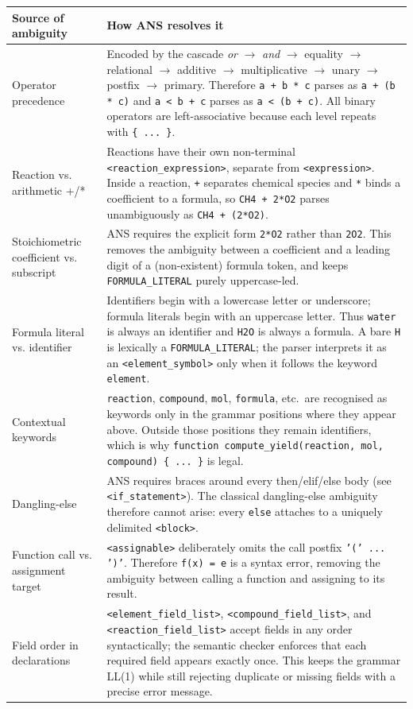 \documentclass[11pt,a4paper]{article}
\newcommand{\thd}[1]{\textbf{\color{white}#1}}
\newcommand{\code}[1]{\texttt{#1}}
\begin{document}
{\footnotesize
{}
\begin{tabularx}{\linewidth}{@{}>{\RaggedRight\arraybackslash}p{4.0cm} Y@{}}
\toprule
{}\thd{Source of ambiguity} & \thd{How ANS resolves it}\\
\midrule
Operator precedence
  & Encoded by the cascade
    \textit{or} $\to$ \textit{and} $\to$ equality $\to$ relational $\to$
    additive $\to$ multiplicative $\to$ unary $\to$ postfix $\to$ primary.
    Therefore \code{a + b * c} parses as \code{a + (b * c)} and
    \code{a < b + c} parses as \code{a < (b + c)}. All binary operators are
    left-associative because each level repeats with \code{\{ ... \}}.\\
Reaction vs. arithmetic +/*
  & Reactions have their own non-terminal \code{<reaction\_expression>},
    separate from \code{<expression>}. Inside a reaction, \code{+} separates
    chemical species and \code{*} binds a coefficient to a formula, so
    \code{CH4 + 2*O2} parses unambiguously as \code{CH4 + (2*O2)}.\\
Stoichiometric coefficient vs. subscript
  & ANS requires the explicit form \code{2*O2} rather than \code{2O2}. This
    removes the ambiguity between a coefficient and a leading digit of a
    (non-existent) formula token, and keeps \code{FORMULA\_LITERAL} purely
    uppercase-led.\\
Formula literal vs. identifier
  & Identifiers begin with a lowercase letter or underscore; formula literals
    begin with an uppercase letter. Thus \code{water} is always an identifier
    and \code{H2O} is always a formula. A bare \code{H} is lexically a
    \code{FORMULA\_LITERAL}; the parser interprets it as an
    \code{<element\_symbol>} only when it follows the keyword \code{element}.\\
Contextual keywords
  & \code{reaction}, \code{compound}, \code{mol}, \code{formula}, etc.\ are
    recognised as keywords only in the grammar positions where they appear
    above. Outside those positions they remain identifiers, which is why
    \code{function compute\_yield(reaction, mol, compound) \{ ... \}} is
    legal.\\
Dangling-else
  & ANS requires braces around every then/elif/else body
    (see \code{<if\_statement>}). The classical dangling-else ambiguity
    therefore cannot arise: every \code{else} attaches to a uniquely
    delimited \code{<block>}.\\
Function call vs. assignment target
  & \code{<assignable>} deliberately omits the call postfix
    \code{'(' ... ')'}. Therefore \code{f(x) = e} is a syntax error,
    removing the ambiguity between calling a function and assigning to its
    result.\\
Field order in declarations
  & \code{<element\_field\_list>}, \code{<compound\_field\_list>}, and
    \code{<reaction\_field\_list>} accept fields in any order syntactically;
    the semantic checker enforces that each required field appears exactly
    once. This keeps the grammar LL(1) while still rejecting duplicate or
    missing fields with a precise error message.\\
\bottomrule
\end{tabularx}}
\end{document}
